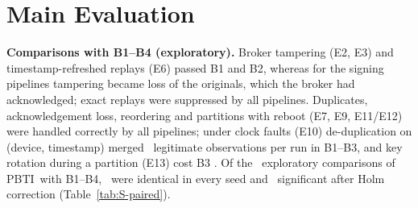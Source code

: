 \documentclass[10pt,a4paper]{article}
\newcommand{\sys}{PBTI}
\begin{document}
\begin{table}[!htbp]
\caption{Split of the registered withheld time $W$ into delay (observations authoritative at the end of the drain) and end-of-run loss (observations still missing then; not proof that later recovery is impossible), seconds per legitimate observation, means over seeds 21--40; denominator and horizon as for $W$. B5: corrected implementation; exploratory.\label{tab:S-v9-wsplit}}
\footnotesize\centering

\end{table}

\section{Main Evaluation}\label{sec:S-main}
\noindent\textbf{Comparisons with B1--B4 (exploratory).} Broker tampering (E2, E3) and timestamp-refreshed replays (E6) passed B1 and B2, whereas for the signing pipelines tampering became loss of the originals, which the broker had acknowledged; exact replays were suppressed by all pipelines. Duplicates, acknowledgement loss, reordering and partitions with reboot (E7, E9, E11/E12) were handled correctly by all pipelines; under clock faults (E10) de-duplication on (device, timestamp) merged \RSOneZeroBOnelegitmissing\ legitimate observations per run in B1--B3, and key rotation during a partition (E13) cost B3 \RSOneThreeBThreelegitmissing. Of the \RPairedTestsTotal\ exploratory comparisons of \sys\ with B1--B4, \RPairedTestsIdentical\ were identical in every seed and \RPairedTestsSignificant\ significant after Holm correction (Table~\ref{tab:S-paired}).
\end{document}
